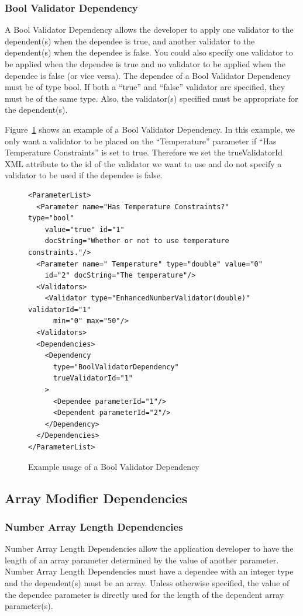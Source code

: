 \subsubsection{Bool Validator Dependency}
A Bool Validator Dependency allows the developer to apply one validator to the dependent(s) when the dependee is true, and another validator
to the dependent(s) when the dependee is false. You could also specify one validator to be applied when the dependee is true and no validator
to be applied when the dependee is false (or vice versa). The dependee of a Bool Validator Dependency must be of type bool. If both a ``true'' and
``false'' validator are specified, they must be of the same type. Also, the validator(s) specified must be appropriate for the dependent(s).

Figure~\ref{BoolValidDepXML} shows an example of a Bool Validator Dependency. In this example, we only want a validator to be placed on the
``Temperature'' parameter if ``Has Temperature Constraints'' is set to true. Therefore we set the trueValidatorId XML attribute to the id of the
validator we want to use and do not specify a validator to be used if the dependee is false.
\begin{figure}
\centering
{\footnotesize
\begin{Verbatim}
<ParameterList>
  <Parameter name="Has Temperature Constraints?" type="bool" 
    value="true" id="1" 
    docString="Whether or not to use temperature constraints."/>
  <Parameter name=" Temperature" type="double" value="0"
    id="2" docString="The temperature"/>
  <Validators>
    <Validator type="EnhancedNumberValidator(double)" validatorId="1"
      min="0" max="50"/>
  <Validators>
  <Dependencies>
    <Dependency 
      type="BoolValidatorDependency" 
      trueValidatorId="1"
    >
      <Dependee parameterId="1"/>
      <Dependent parameterId="2"/>
    </Dependency>
  </Dependencies>
</ParameterList>
\end{Verbatim}
}
\caption{Example usage of a Bool Validator Dependency}
\label{BoolValidDepXML}
\end{figure}

\subsection{Array Modifier Dependencies}
\subsubsection{Number Array Length Dependencies}
Number Array Length Dependencies allow the application developer to have the length of an array parameter determined by the value of another parameter. Number Array Length
Dependencies must have a dependee with an integer type and the dependent(s) must be an array. Unless otherwise specified, the value of the dependee parameter is directly
used for the length of the dependent array parameter(s). 


